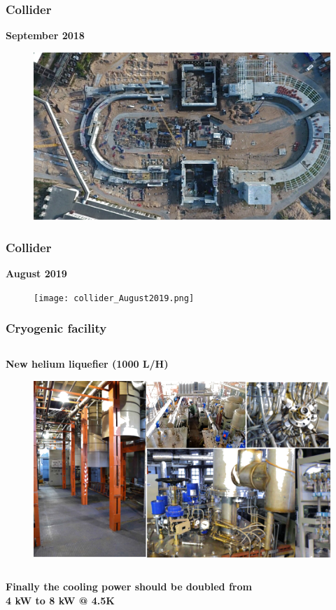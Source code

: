 \documentclass[dvipsnames] {beamer}
\begin{document}
\begin{frame}
  \frametitle{\bf \centering Collider}
  \begin{block}{\bf \centering September 2018}
     \begin{figure}[H]
        \includegraphics[width=.8\linewidth]{collider_now.png} 
      \end{figure}
  \end{block}
\end{frame}

\begin{frame}
  \frametitle{\bf \centering Collider}
  \begin{block}{\bf \centering August 2019}
     \begin{figure}[H]
        \texttt{[image: collider\_August2019.png]} 
      \end{figure}
  \end{block}
\end{frame}

\begin{frame}
  \frametitle{\bf \centering Cryogenic facility}
  \vskip -0.75cm
  \begin{columns}[t]
    \begin{block}{\bf \centering New helium liquefier (1000 L/H)}
      \begin{figure}[H]
        \includegraphics[width=1.\linewidth]{liquefier.png} 
      \end{figure}
    \end{block}
    
  \end{columns}
  \begin{block}{}
    \bf Finally the cooling power should be doubled from \\ 4 kW to 8 kW @ 4.5K
  \end{block}
\end{frame}
\end{document}
